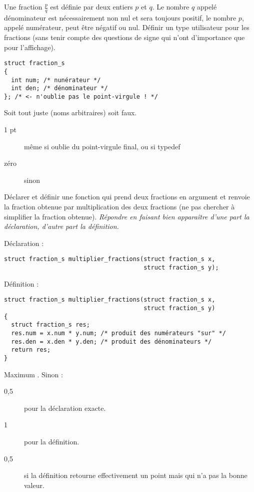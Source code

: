 \question Une fraction $\frac{p}{q}$ est définie par deux entiers $p$ et $q$. Le nombre
$q$ appelé dénominateur est nécessairement non nul et sera toujours positif, le
nombre $p$, appelé numérateur, peut être négatif ou nul. Définir un
type utilisateur pour les fractions (sans tenir compte des questions
de signe qui n'ont d'importance que pour l'affichage).
\begin{correction}
\begin{verbatim}
struct fraction_s
{
  int num; /* nunérateur */
  int den; /* dénominateur */
}; /* <- n'oublie pas le point-virgule ! */
\end{verbatim}
 \begin{baremeenv}
  Soit tout juste (noms arbitraires) soit faux.
    \begin{description}
    \item[1 pt] même si oublie du point-virgule final, ou si typedef
    \item[zéro] sinon
   \end{description}
  \end{baremeenv}
\end{correction}

\question Déclarer et définir une fonction  qui
    prend deux fractions en argument et renvoie la fraction obtenue par multiplication des deux
    fractions (ne pas chercher à simplifier la fraction
    obtenue). \emph{Répondre en faisant bien apparaître d'une part la
      déclaration, d'autre part la définition.}
\begin{correction}
Déclaration :
\begin{verbatim}
struct fraction_s multiplier_fractions(struct fraction_s x, 
                                       struct fraction_s y);
\end{verbatim}
Définition :
\begin{verbatim}
struct fraction_s multiplier_fractions(struct fraction_s x, 
                                       struct fraction_s y)
{
  struct fraction_s res;
  res.num = x.num * y.num; /* produit des numérateurs "sur" */
  res.den = x.den * y.den; /* produit des dénominateurs */
  return res;
}
\end{verbatim}

  \begin{baremeenv}
    Maximum . Sinon :
    \begin{description}
    \item[0,5] pour la déclaration exacte.
    \item[1] pour la définition.
    \item[0,5] si la définition retourne effectivement un point mais
      qui n'a pas la bonne valeur.
    \end{description}
  \end{baremeenv}
\end{correction}

